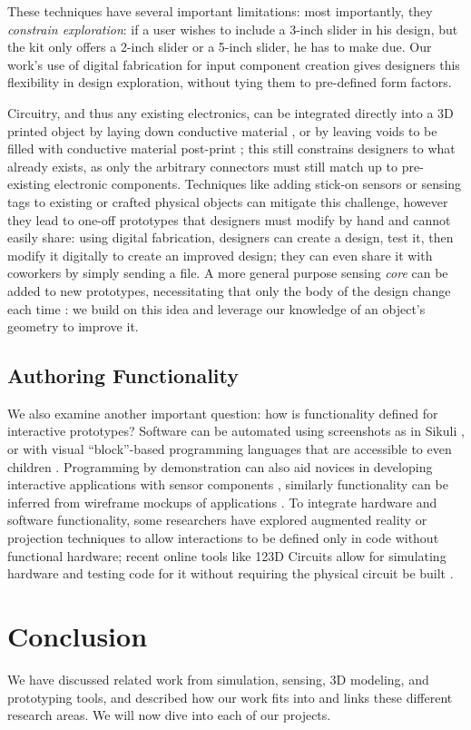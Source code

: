     These techniques have several important limitations: most importantly, they \emph{constrain exploration}: if a user wishes to include a 3-inch slider in his design, but the kit only offers a 2-inch slider or a 5-inch slider, he has to make due. Our work's use of digital fabrication for input component creation gives designers this flexibility in design exploration, without tying them to pre-defined form factors.

    Circuitry, and thus any existing electronics, can be integrated directly into a 3D printed object by laying down conductive material \cite{sells-reprap,voxel8,sarik-tracebrush}, or by leaving voids to be filled with conductive material post-print \cite{savage-sot}; this still constrains designers to what already exists, as only the arbitrary connectors must still match up to pre-existing electronic components. Techniques like adding stick-on sensors or sensing tags to existing or crafted physical objects \cite{maynes-aminzade-eyepatch,yeo-stickear} can mitigate this challenge, however they lead to one-off prototypes that designers must modify by hand and cannot easily share: using digital fabrication, designers can create a design, test it, then modify it digitally to create an improved design; they can even share it with coworkers by simply sending a file. A more general purpose sensing \emph{core} can be added to new prototypes, necessitating that only the body of the design change each time \cite{doering-composition}: we build on this idea and leverage our knowledge of an object's geometry to improve it.

    \subsection{Authoring Functionality}
    We also examine another important question: how is functionality defined for interactive prototypes? Software can be automated using screenshots as in Sikuli \cite{yeh-sikuli}, or with visual ``block''-based programming languages that are accessible to even children \cite{resnick-scratch}. Programming by demonstration can also aid novices in developing interactive applications with sensor components \cite{hartmann-dtools}, similarly functionality can be inferred from wireframe mockups of applications \cite{li-framewire}. To integrate hardware and software functionality, some researchers have explored augmented reality \cite{nam-AR} or projection \cite{akaoka-displayobjects} techniques to allow interactions to be defined only in code without functional hardware; recent online tools like 123D Circuits allow for simulating hardware and testing code for it without requiring the physical circuit be built \cite{123dcircuits}.

\section{Conclusion}

We have discussed related work from simulation, sensing, 3D modeling, and prototyping tools, and described how our work fits into and links these different research areas. We will now dive into each of our projects.
